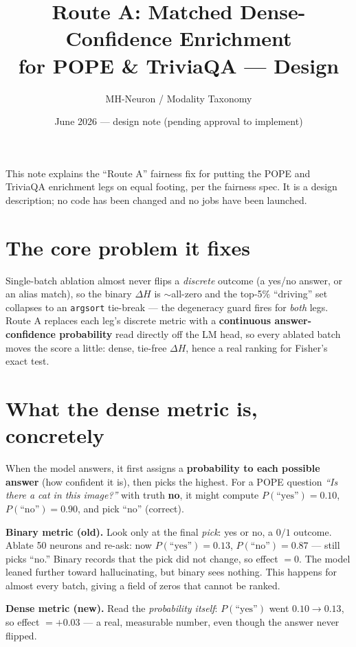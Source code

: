 \documentclass[11pt,a4paper]{article}
\title{Route A: Matched Dense-Confidence Enrichment\\for POPE \& TriviaQA --- Design}
\author{MH-Neuron / Modality Taxonomy}
\date{June 2026 --- design note (pending approval to implement)}
\newcommand{\code}[1]{\texttt{#1}}
\begin{document}
\maketitle

\noindent This note explains the ``Route A'' fairness fix for putting the POPE and
TriviaQA enrichment legs on equal footing, per the fairness spec. It is a design
description; no code has been changed and no jobs have been launched.

\section{The core problem it fixes}
Single-batch ablation almost never flips a \emph{discrete} outcome (a yes/no answer,
or an alias match), so the binary $\Delta H$ is $\sim$all-zero and the top-5\%
``driving'' set collapses to an \code{argsort} tie-break --- the degeneracy guard
fires for \emph{both} legs. Route A replaces each leg's discrete metric with a
\textbf{continuous answer-confidence probability} read directly off the LM head, so
every ablated batch moves the score a little: dense, tie-free $\Delta H$, hence a real
ranking for Fisher's exact test.

\section{What the dense metric is, concretely}
When the model answers, it first assigns a \textbf{probability to each possible answer}
(how confident it is), then picks the highest. For a POPE question \emph{``Is there a cat in
this image?''} with truth \textbf{no}, it might compute $P(\text{``yes''})=0.10$,
$P(\text{``no''})=0.90$, and pick ``no'' (correct).

\textbf{Binary metric (old).} Look only at the final \emph{pick}: yes or no, a $0/1$
outcome. Ablate 50 neurons and re-ask: now $P(\text{``yes''})=0.13$,
$P(\text{``no''})=0.87$ --- still picks ``no.'' Binary records that the pick did not change,
so effect $=0$. The model leaned further toward hallucinating, but binary sees nothing. This
happens for almost every batch, giving a field of zeros that cannot be ranked.

\textbf{Dense metric (new).} Read the \emph{probability itself}: $P(\text{``yes''})$ went
$0.10 \to 0.13$, so effect $=+0.03$ --- a real, measurable number, even though the answer
never flipped.
\end{document}
